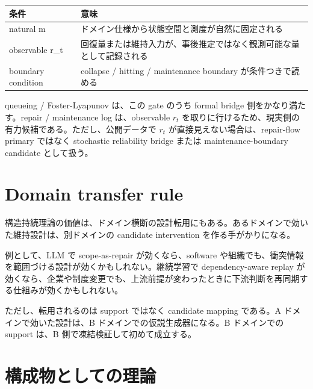 \documentclass[12pt,a4paper]{article}
\begin{document}
{\def\LTcaptype{table} %
\begin{longtable}[]{@{}
  >{\raggedright\arraybackslash}p{}
  >{\raggedright\arraybackslash}p{}@{}}
\toprule\noalign{}
\begin{minipage}[b]{\linewidth}\raggedright
条件
\end{minipage} & \begin{minipage}[b]{\linewidth}\raggedright
意味
\end{minipage} \\
\midrule\noalign{}
\endhead
\bottomrule\noalign{}
\endlastfoot
natural m & ドメイン仕様から状態空間と測度が自然に固定される \\
observable r\_t & 回復量または維持入力が、事後推定ではなく観測可能な量として記録される \\
boundary condition & collapse / hitting / maintenance boundary が条件つきで読める \\
\end{longtable}
}

queueing / Foster-Lyapunov は、この gate のうち formal bridge 側をかなり満たす。repair / maintenance log は、observable \(r_{t}\) を取りに行けるため、現実側の有力候補である。ただし、公開データで \(r_{t}\) が直接見えない場合は、repair-flow primary ではなく stochastic reliability bridge または maintenance-boundary candidate として扱う。

\section{Domain transfer rule}\label{domain-transfer-rule}

構造持続理論の価値は、ドメイン横断の設計転用にもある。あるドメインで効いた維持設計は、別ドメインの candidate intervention を作る手がかりになる。

例として、LLM で scope-as-repair が効くなら、software や組織でも、衝突情報を範囲づける設計が効くかもしれない。継続学習で dependency-aware replay が効くなら、企業や制度変更でも、上流前提が変わったときに下流判断を再同期する仕組みが効くかもしれない。

ただし、転用されるのは support ではなく candidate mapping である。A ドメインで効いた設計は、B ドメインでの仮説生成器になる。B ドメインでの support は、B 側で凍結検証して初めて成立する。

\section{構成物としての理論}\label{ux69cbux6210ux7269ux3068ux3057ux3066ux306eux7406ux8ad6}
\end{document}
